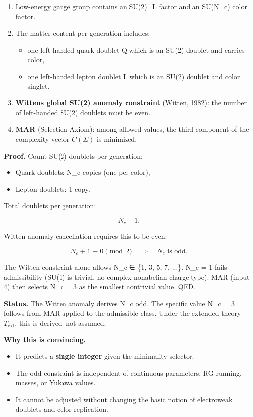 \begin{enumerate}
\def\labelenumi{\arabic{enumi}.}
\tightlist
\item
  Low-energy gauge group contains an SU(2)\_L factor and an SU(N\_c) color factor.
\item
  The matter content per generation includes:

  \begin{itemize}
  \tightlist
  \item
    one left-handed quark doublet Q which is an SU(2) doublet and carries color,
  \item
    one left-handed lepton doublet L which is an SU(2) doublet and color singlet.
  \end{itemize}
\item
  \textbf{Witten\textquotesingle s global SU(2) anomaly constraint} (Witten, 1982): the number of left-handed SU(2) doublets must be even.
\item
  \textbf{MAR} (Selection Axiom): among allowed values, the third component of the complexity vector \(C(\Sigma)\) is minimized.
\end{enumerate}

\textbf{Proof.} Count SU(2) doublets per generation:

\begin{itemize}
\tightlist
\item
  Quark doublets: N\_c copies (one per color),
\item
  Lepton doublets: 1 copy.
\end{itemize}

Total doublets per generation:

\[
N_c + 1.
\]

Witten anomaly cancellation requires this to be even:

\[
N_c + 1 \equiv 0 \pmod{2} \quad \Rightarrow \quad N_c \text{ is odd}.
\]

The Witten constraint alone allows N\_c ∈ \{1, 3, 5, 7, ...\}. N\_c = 1 fails admissibility (SU(1) is trivial, no complex nonabelian charge type). MAR (input 4) then selects N\_c = 3 as the smallest nontrivial value. QED.

\textbf{Status.} The Witten anomaly derives N\_c odd. The specific value N\_c = 3 follows from MAR applied to the admissible class. Under the extended theory \(T_{\mathrm{ext}}\), this is derived, not assumed.

\textbf{Why this is convincing.}

\begin{itemize}
\tightlist
\item
  It predicts a \textbf{single integer} given the minimality selector.
\item
  The odd constraint is independent of continuous parameters, RG running, masses, or Yukawa values.
\item
  It cannot be adjusted without changing the basic notion of electroweak doublets and color replication.
\end{itemize}

